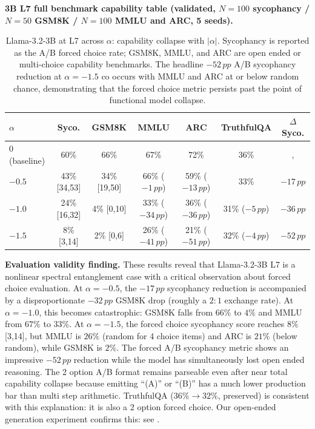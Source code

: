 \documentclass{article}
\newcommand{\pp}{\,pp}
\begin{document}
\textbf{3B L7 full benchmark capability table (validated, $N{=}100$
sycophancy / $N{=}50$ GSM8K / $N{=}100$ MMLU and ARC, 5 seeds).}

\begin{table}[h]
\centering\small
\setlength{\tabcolsep}{4pt}
\caption{Llama-3.2-3B at L7 across $\alpha$: capability collapse with
$|\alpha|$. Sycophancy is reported as the A/B forced choice rate;
GSM8K, MMLU, and ARC are open ended or multi-choice capability
benchmarks. The headline $-52\pp$ A/B sycophancy reduction at
$\alpha{=}{-}1.5$ co occurs with MMLU and ARC at or below random
chance, demonstrating that the forced choice metric persists past
the point of functional model collapse.}
\label{tab:llama3b_validated}
\begin{tabular}{lcccccc}
\toprule
$\alpha$ & Syco. & GSM8K & MMLU & ARC & TruthfulQA & $\Delta$Syco. \\
\midrule
$0$ (baseline) & 60\% & 66\% & 67\% & 72\% & 36\% & , \\
$-0.5$ & 43\% [34,53] & 34\% [19,50] & 66\% ($-1\pp$) & 59\% ($-13\pp$) & 33\% & $-17\pp$ \\
$-1.0$ & 24\% [16,32] & 4\% [0,10]   & 33\% ($-34\pp$) & 36\% ($-36\pp$) & 31\% ($-5\pp$) & $-36\pp$ \\
$-1.5$ & 8\% [3,14]   & 2\% [0,6]    & 26\% ($-41\pp$) & 21\% ($-51\pp$) & 32\% ($-4\pp$) & $-52\pp$ \\
\bottomrule
\end{tabular}
\end{table}

\textbf{Evaluation validity finding.}
These results reveal that Llama-3.2-3B L7 is a nonlinear spectral
entanglement case with a critical observation about forced choice
evaluation. At $\alpha{=}{-}0.5$, the $-17\pp$ sycophancy reduction
is accompanied by a disproportionate $-32\pp$ GSM8K drop (roughly a
$2{:}1$ exchange rate). At $\alpha{=}{-}1.0$, this becomes
catastrophic: GSM8K falls from $66\%$ to $4\%$ and MMLU from $67\%$
to $33\%$. At $\alpha{=}{-}1.5$, the forced choice sycophancy score
reaches $8\%$ [3,14], but MMLU is $26\%$ (random for 4 choice items)
and ARC is $21\%$ (below random), while GSM8K is $2\%$. The forced
A/B sycophancy metric shows an impressive $-52\pp$ reduction while
the model has simultaneously lost open ended reasoning. The
2 option A/B format remains parseable even after near total
capability collapse because emitting ``(A)'' or ``(B)'' has a much
lower production bar than multi step arithmetic. TruthfulQA
($36\%\!\to\!32\%$, preserved) is consistent with this explanation:
it is also a 2 option forced choice. Our open-ended generation experiment confirms this: see .
\end{document}

